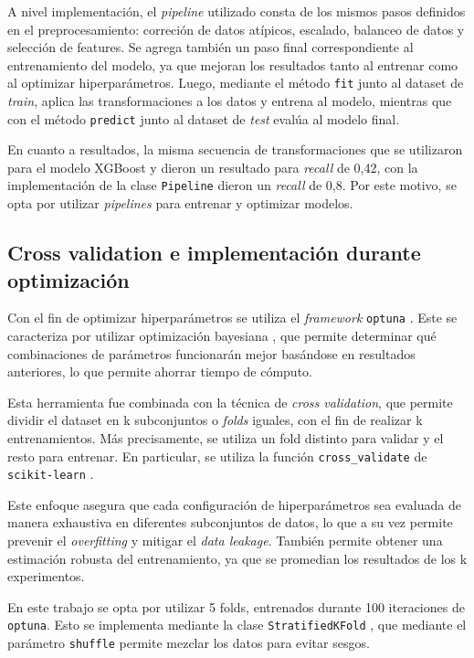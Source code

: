 A nivel implementación, el \textit{pipeline} utilizado consta de los mismos pasos definidos en el preprocesamiento: correción de datos atípicos, escalado, balanceo de datos y selección de features. Se agrega también un paso final correspondiente al entrenamiento del modelo, ya que mejoran los resultados tanto al entrenar como al optimizar hiperparámetros. Luego, mediante el método \texttt{fit} junto al dataset de \textit{train}, aplica las transformaciones a los datos y entrena al modelo, mientras que con el método \texttt{predict} junto al dataset de \textit{test} evalúa al modelo final.

En cuanto a resultados, la misma secuencia de transformaciones que se utilizaron para el modelo XGBoost y dieron un resultado para \textit{recall} de 0,42, con la implementación de la clase \texttt{Pipeline} dieron un \textit{recall} de 0,8. Por este motivo, se opta por utilizar \textit{pipelines} para entrenar y optimizar modelos.

\subsection{Cross validation e implementación durante optimización}

Con el fin de optimizar hiperparámetros se utiliza el \textit{framework} \texttt{optuna} \citep{article:optuna}. Este se caracteriza por utilizar optimización bayesiana \citep{artice:bayesion-optimization}, que permite determinar qué combinaciones de parámetros funcionarán mejor basándose en resultados anteriores, lo que permite ahorrar tiempo de cómputo.

Esta herramienta fue combinada con la técnica de \textit{cross validation}, que permite dividir el dataset en k subconjuntos o \textit{folds} iguales, con el fin de realizar k entrenamientos. Más precisamente, se utiliza un fold distinto para validar y el resto para entrenar. En particular, se utiliza la función \texttt{cross\_validate} \citep{WEBSITE:crossvalidate} de \texttt{scikit-learn} \citep{WEBSITE:scikit-learn}.

Este enfoque asegura que cada configuración de hiperparámetros sea evaluada de manera exhaustiva en diferentes subconjuntos de datos, lo que a su vez permite prevenir el \textit{overfitting} y mitigar el \textit{data leakage}. También permite obtener una estimación robusta del entrenamiento, ya que se promedian los resultados de los k experimentos.

En este trabajo se opta por utilizar 5 folds, entrenados durante 100 iteraciones de \texttt{optuna}. Esto se implementa mediante la clase \texttt{StratifiedKFold} \citep{WEBSITE:stratifiedkfold}, que mediante el parámetro \texttt{shuffle} permite mezclar los datos para evitar sesgos.

